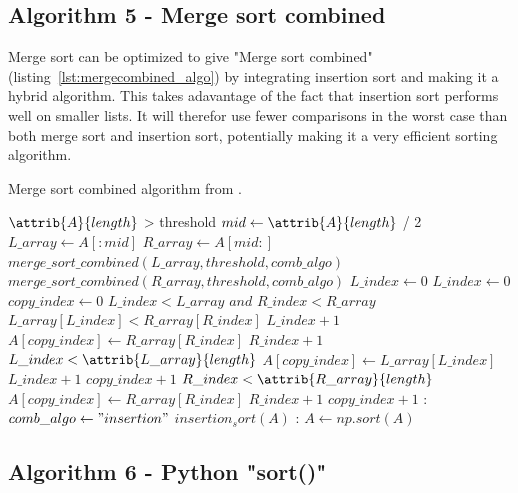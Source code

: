 \documentclass[sigconf, nonacm, natbib, screen, balance=False]{acmart}
\begin{document}
\subsection{Algorithm 5 - Merge sort combined}\label{sec:algo2}

Merge sort can be optimized to give "Merge sort combined" (listing~\ref{lst:mergecombined_algo}) by integrating insertion sort and making it a hybrid algorithm. This takes adavantage of the fact that insertion sort performs well on smaller lists. It will therefor use fewer comparisons in the worst case than both merge sort and insertion sort, potentially making it a very efficient sorting algorithm.  

\begin{listing}
  \caption{Merge sort combined algorithm from \citet[Ch.~2.1]{CLRS_2009}.}
  \label{lst:mergecombined_algo}
  
 \begin{codebox}
    \li \If $\attrib{A}{length}$ > threshold
    \li \Do
    $mid \gets \attrib{A}{length}$ / 2 
    \li $L\_array\gets A[:mid]$
    \li $R\_array\gets A[mid:]$
    \li $merge\_sort\_combined(L\_array, threshold, comb\_algo)$
    \li $merge\_sort\_combined(R\_array, threshold, comb\_algo)$
    \li $L\_index\gets 0$
    \li $L\_index\gets 0$
    \li $copy\_index\gets 0$
    \li \While $L\_index < L\_array$ $and$ $R\_index < R\_array$ 
    \li \Do
    \If $L\_array[L\_index] < R\_array[R\_index]$
    \li \Do
    $L\_index + 1$
    \li \Else
    \li $A[copy\_index] \gets R\_array[R\_index]$
    \li $R\_index + 1$
    \End
    \End
    \li \While $L\_index < \attrib{L\_array}{length}$
    \li \Do
    $A[copy\_index] \gets L\_array[L\_index]$
    \li $L\_index + 1$
    \li $copy\_index + 1$
    \End
    \li \While $R\_index < \attrib{R\_array}{length}$
    \li \Do
    $A[copy\_index] \gets R\_array[R\_index]$
    \li $R\_index + 1$
    \li $copy\_index + 1$
    \End
    \li \Else:
    \li \If $comb\_algo \gets "insertion"$
    \li \Do
    $insertion_sort(A)$
    \li \Else:
    $A \gets np.sort(A)$
  \end{codebox}
\end{listing}

\subsection{Algorithm 6 - Python "sort()" }\label{sec:algo2}
\end{document}
